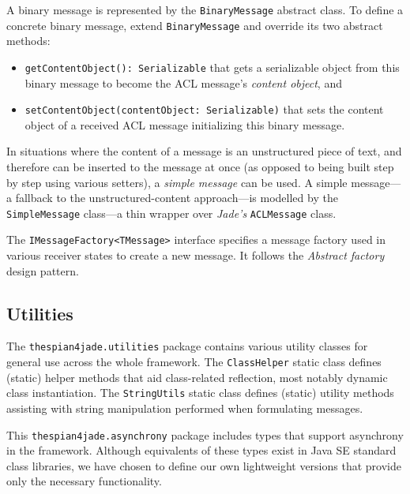 A binary message is represented by the \texttt{BinaryMessage} abstract class.
To define a concrete binary message, extend \texttt{BinaryMessage} and override its two abstract methods:
\begin{itemize}
	\item \texttt{getContentObject(): Serializable} that gets a serializable object from this binary message to become the ACL message's \textit{content object}, and
	\item \texttt{setContentObject(contentObject: Serializable)} that sets the content object of a received ACL message initializing this binary message.
\end{itemize}

In situations where the content of a message is an unstructured piece of text, and therefore can be inserted to the message at once (as opposed to being built step by step using various setters), a \textit{simple message} can be used.
A simple message---a fallback to the unstructured-content approach---is modelled by the \texttt{SimpleMessage} class---a thin wrapper over \textit{Jade's} \texttt{ACLMessage} class.

The \texttt{IMessageFactory<TMessage>} interface specifies a message factory used in various receiver states to create a new message.
It follows the \textit{Abstract factory} design pattern.

\subsection{Utilities}

The \texttt{thespian4jade.utilities} package contains various utility classes for general use across the whole framework.
The \texttt{ClassHelper} static class defines (static) helper methods that aid class-related reflection, most notably dynamic class instantiation.
The \texttt{StringUtils} static class defines (static) utility methods assisting with string manipulation performed when formulating messages.

This \texttt{thespian4jade.asynchrony} package includes types that support asynchrony in the framework.
Although equivalents of these types exist in Java SE standard class libraries, we have chosen to define our own lightweight versions that provide only the necessary functionality. 

